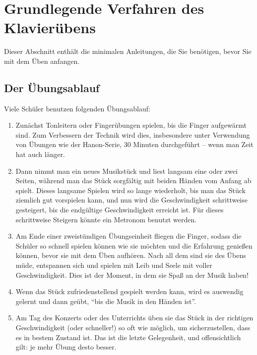 
\section{Grundlegende Verfahren des Klavierübens}
\label{c1ii1}


Dieser Abschnitt enthält die minimalen Anleitungen, die Sie benötigen, bevor Sie mit dem Üben anfangen.
 

\subsection{Der Übungsablauf} 

Viele Schüler benutzen folgenden Übungsablauf:

\begin{enumerate}[label={\arabic*.}] 
\item Zunächst Tonleitern oder Fingerübungen spielen, bis die Finger aufgewärmt sind.
Zum Verbessern der Technik wird dies, insbesondere unter Verwendung von Übungen wie der Hanon-Serie, 30 Minuten durchgeführt -- wenn man Zeit hat auch länger.
\item Dann nimmt man ein neues Musikstück und liest langsam eine oder zwei Seiten, während man das Stück sorgfältig mit beiden Händen vom Anfang ab spielt.
Dieses langsame Spielen wird so lange wiederholt, bis man das Stück ziemlich gut vorspielen kann, und nun wird die Geschwindigkeit schrittweise gesteigert, bis die endgültige Geschwindigkeit erreicht ist.
Für dieses schrittweise Steigern könnte ein Metronom benutzt werden.
\item Am Ende einer zweistündigen Übungseinheit fliegen die Finger, sodass die Schüler so schnell spielen können wie sie möchten und die Erfahrung genießen können, bevor sie mit dem Üben aufhören.
Nach all dem sind sie des Übens müde, entspannen sich und spielen mit Leib und Seele mit voller Geschwindigkeit.
Dies ist der Moment, in dem sie Spaß an der Musik haben!\item Wenn das Stück zufriedenstellend gespielt werden kann, wird es auswendig gelernt und dann geübt, \enquote{bis die Musik in den Händen ist}.

\item Am Tag des Konzerts oder des Unterrichts üben sie das Stück in der richtigen Geschwindigkeit (oder schneller!) so oft wie möglich, um sicherzustellen, dass es in bestem Zustand ist.
Das ist die letzte Gelegenheit, und offensichtlich gilt: je mehr Übung desto besser.
\end{enumerate}

